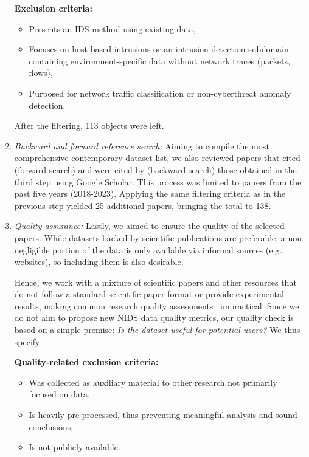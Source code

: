 \begin{enumerate}[topsep=2pt]
\noindent \textbf{Exclusion criteria:}
\begin{itemize}[topsep=1pt, itemsep=3pt, parsep=0pt]
    \item Presents an IDS method using existing data,
    \item Focuses on host-based intrusions or an intrusion detection subdomain containing environment-specific data without network traces (packets, flows),
    \item Purposed for network traffic classification or non-cyberthreat anomaly detection.

\end{itemize}

    After the filtering, 113 objects were left.

    \item \emph{Backward and forward reference search:} Aiming to compile the most comprehensive contemporary dataset list, we also reviewed papers that cited (forward search) and were cited by (backward search) those obtained in the third step using Google Scholar. This process was limited to papers from the past five years (2018-2023). Applying the same filtering criteria as in the previous step yielded 25 additional papers, bringing the total to 138.

    \item \emph{Quality assurance:} Lastly, we aimed to ensure the quality of the selected papers. While datasets backed by scientific publications are preferable, a non-negligible portion of the data is only available via informal sources (e.g., websites), so including them is also desirable.
    
    Hence, we work with a mixture of scientific papers and other resources that do not follow a standard scientific paper format or provide experimental results, making common research quality assessments~\cite{yang2021_qa_slr} impractical. Since we do not aim to propose new NIDS data quality metrics, our quality check is based on a simple premise: \emph{Is the dataset useful for potential users?} We thus specify:

    \noindent \textbf{Quality-related exclusion criteria:}
    \begin{itemize}[topsep=1pt, itemsep=3pt, parsep=0pt]
        \item Was collected as auxiliary material to other research not primarily focused on data,
        \item Is heavily pre-processed, thus preventing meaningful analysis and sound conclusions,
        \item Is not publicly available.
    \end{itemize}
\end{enumerate}

